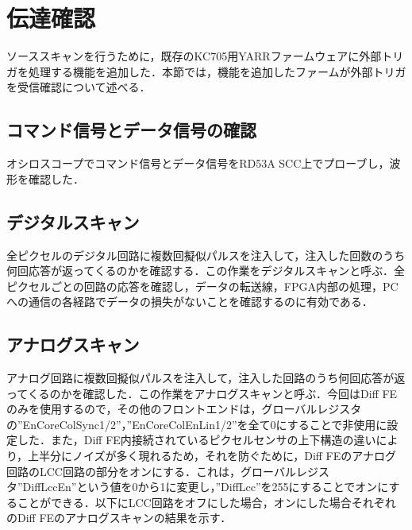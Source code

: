 \section{伝達確認}
ソーススキャンを行うために，既存のKC705用YARRファームウェアに外部トリガを処理する機能を追加した．本節では，機能を追加したファームが外部トリガを受信確認について述べる．

\subsection{コマンド信号とデータ信号の確認}
オシロスコープでコマンド信号とデータ信号をRD53A SCC上でプローブし，波形を確認した．

\subsection{デジタルスキャン}
全ピクセルのデジタル回路に複数回擬似パルスを注入して，注入した回数のうち何回応答が返ってくるのかを確認する．この作業をデジタルスキャンと呼ぶ．全ピクセルごとの回路の応答を確認し，データの転送線，FPGA内部の処理，PCへの通信の各経路でデータの損失がないことを確認するのに有効である．

\subsection{アナログスキャン}
アナログ回路に複数回擬似パルスを注入して，注入した回路のうち何回応答が返ってくるのかを確認した．この作業をアナログスキャンと呼ぶ．今回はDiff FEのみを使用するので，その他のフロントエンドは，グローバルレジスタの''EnCoreColSync1/2''，''EnCoreColEnLin1/2''を全て0にすることで非使用に設定した．また，Diff FE内接続されているピクセルセンサの上下構造の違いにより，上半分にノイズが多く現れるため，それを防ぐために，Diff FEのアナログ回路のLCC回路の部分をオンにする．これは，グローバルレジスタ''DiffLccEn''という値を0から1に変更し，''DiffLcc''を255にすることでオンにすることができる．以下にLCC回路をオフにした場合，オンにした場合それぞれのDiff FEのアナログスキャンの結果を示す．

